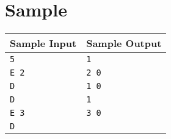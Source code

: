\documentclass{article}
\begin{document}
\section*{Sample}

\begin{tabular}{l|l}
    \hline
    \hline
    Sample Input & Sample Output \\
    \hline
    \verb+5+ & \verb+1+ \\
    \verb+E 2+ & \verb+2 0+ \\
    \verb+D+ & \verb+1 0+ \\
    \verb+D+ & \verb+1+ \\
    \verb+E 3+ & \verb+3 0+ \\
    \verb+D+ & \verb++ \\
    \hline
\end{tabular}
\end{document}
